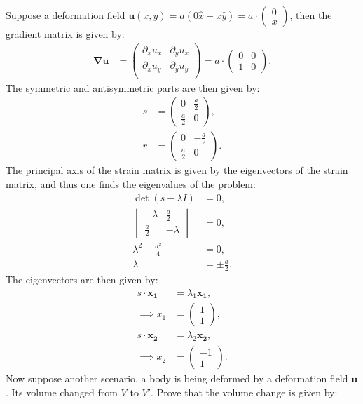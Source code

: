 \documentclass[a4paper]{article}
\newcommand{\grad}{\mathbf{\nabla}}
\begin{document}
\vspace*{0.5cm}\noindent
Suppose a deformation field $\mathbf{u}(x,y) = a\left(0\hat{x} + x\hat{y}\right) = a\cdot\begin{pmatrix}0\\x\end{pmatrix}$, then the gradient matrix is given by:
\begin{align*}
    \grad{\mathbf{u}} &= \begin{pmatrix}
        \partial_x u_x & \partial_y u_x\\
        \partial_x u_y & \partial_y u_y\\
    \end{pmatrix} = a\cdot \begin{pmatrix}
        0 & 0\\
        1 & 0
    \end{pmatrix}.
\end{align*}The symmetric and antisymmetric parts are then given by:
\begin{align*}
    s &= \begin{pmatrix}
        0& \frac{a}{2}\\
        \frac{a}{2}&0
    \end{pmatrix},\\
    r &= \begin{pmatrix}
        0& -\frac{a}{2}\\
        \frac{a}{2}&0
    \end{pmatrix}.
\end{align*}The principal axis of the strain matrix is given by the eigenvectors of the strain matrix, and thus one finds the eigenvalues of the problem:
\begin{align*}
    \det\left(s - \lambda I\right) &= 0,\\
    \begin{vmatrix}
        -\lambda & \frac{a}{2}\\
        \frac{a}{2} & -\lambda
    \end{vmatrix} &= 0,\\
    \lambda^2 - \frac{a^2}{4} &= 0,\\
    \lambda &= \pm \frac{a}{2}.
\end{align*}The eigenvectors are then given by:
\begin{align*}
   s\cdot\mathbf{x_1} &= \lambda_1\mathbf{x_1},\\
   \implies x_1 &= \begin{pmatrix}
       1\\
       1
    \end{pmatrix},\\
    s\cdot\mathbf{x_2} &= \lambda_2\mathbf{x_2},\\
    \implies x_2 &= \begin{pmatrix}
        -1\\
        1
    \end{pmatrix}.
\end{align*}Now suppose another scenario, a body is being deformed by a deformation field $\mathbf{u}$. Its volume changed from $V$ to $V'$. Prove that the volume change is given by:
\end{document}

